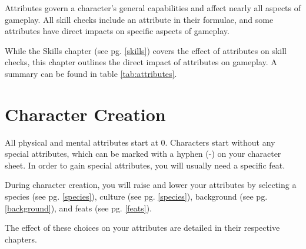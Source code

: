 \begin{multicols}{2}
Attributes govern a character's general capabilities and affect nearly all
aspects of gameplay. All skill checks include an attribute in their formulae,
and some attributes have direct impacts on specific aspects of gameplay.

While the Skills chapter (see pg. \ref{skills}) covers the effect of attributes
on skill checks, this chapter outlines the direct impact of attributes on
    gameplay. A summary can be found in table \ref{tab:attributes}.

\vfill
\columnbreak
\section{Character Creation}
All physical and mental attributes start at 0. Characters start without any
special attributes, which can be marked with a hyphen (-) on your character
sheet. In order to gain special attributes, you will usually need a specific
feat.

During character creation, you will raise and lower your attributes by 
selecting a species (see pg. \ref{species}), culture (see pg. \ref{species}),
background (see pg. \ref{background}), and feats (see pg. \ref{feats}).

The effect of these choices on your attributes are detailed in their respective
chapters.

\end{multicols}




